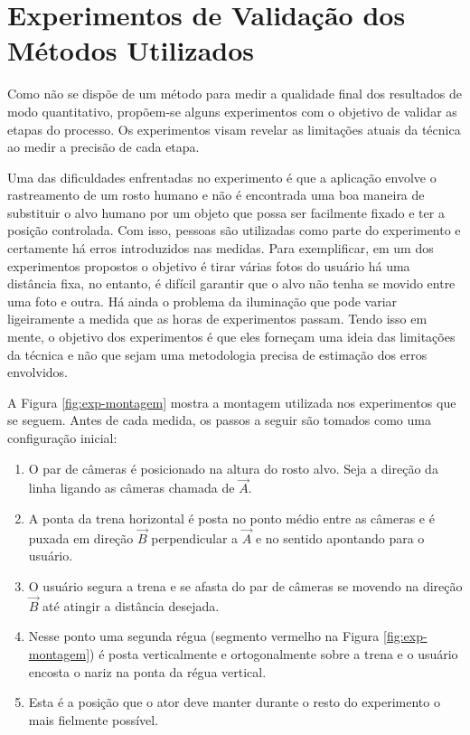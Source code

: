 

\section{Experimentos de Validação dos Métodos Utilizados}

Como não se dispõe de um método para medir a qualidade final dos resultados de modo quantitativo, propõem-se alguns experimentos com o objetivo de validar as etapas do processo. Os experimentos visam revelar as limitações atuais da técnica ao medir a precisão de cada etapa.

Uma das dificuldades enfrentadas no experimento é que a aplicação envolve o rastreamento de um rosto humano e não é encontrada uma boa maneira de substituir o alvo humano por um objeto que possa ser facilmente fixado e ter a posição controlada. Com isso, pessoas são utilizadas como parte do experimento e certamente há erros introduzidos nas medidas. Para exemplificar, em um dos experimentos propostos o objetivo é tirar várias fotos do usuário há uma distância fixa, no entanto, é difícil garantir que o alvo não tenha se movido entre uma foto e outra. Há ainda o problema da iluminação que pode variar ligeiramente a medida que as horas de experimentos passam. Tendo isso em mente, o objetivo dos experimentos é que eles forneçam uma ideia das limitações da técnica e não que sejam uma metodologia precisa de estimação dos erros envolvidos.

A Figura \ref{fig:exp-montagem} mostra a montagem utilizada nos experimentos que se seguem. Antes de cada medida, os passos a seguir são tomados como uma configuração inicial:

\begin{enumerate}
\item O par de câmeras é posicionado na altura do rosto alvo. Seja a direção da linha ligando as câmeras chamada de $\vec{A}$.
\item A ponta da trena horizontal é posta no ponto médio entre as câmeras e é puxada em direção $\vec{B}$ perpendicular a $\vec{A}$ e no sentido apontando para o usuário.
\item O usuário segura a trena e se afasta do par de câmeras se movendo na direção $\vec{B}$ até atingir a distância desejada.
\item Nesse ponto uma segunda régua (segmento vermelho na Figura \ref{fig:exp-montagem}) é posta verticalmente e ortogonalmente sobre a trena e o usuário encosta o nariz na ponta da régua vertical. 
\item Esta é a posição que o ator deve manter durante o resto do experimento o mais fielmente possível.
\end{enumerate}

